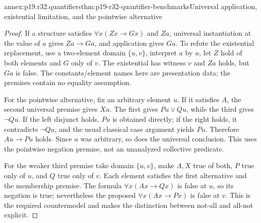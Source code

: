 \begin{annexitem}{annex:p19.r32.quantifiers}{thm:p19-r32-quantifier-benchmarks}{Universal application, existential limitation, and the pointwise alternative}
\begin{proof}
If a structure satisfies \(\forall x(Zx\to Gx)\) and \(Za\),
universal instantiation at the value of \(a\) gives \(Za\to Ga\),
and application gives \(Ga\). To refute the existential replacement,
use a two-element domain \(\{u,v\}\), interpret \(a\) by \(u\),
let \(Z\) hold of both elements and \(G\) only of \(v\).
The existential has witness \(v\) and \(Za\) holds, but \(Ga\)
is false. The constants/element names here are presentation data;
the premises contain no equality assumption.

For the pointwise alternative, fix an arbitrary element \(u\).
If it satisfies \(A\), the second universal premise gives \(Xu\).
The first gives \(Pu\lor Qu\), while the third gives \(\neg Qu\).
If the left disjunct holds, \(Pu\) is obtained directly; if the right
holds, it contradicts \(\neg Qu\), and the usual classical case
argument yields \(Pu\). Therefore \(Au\to Pu\) holds. Since
\(u\) was arbitrary, so does the universal conclusion. This uses
the pointwise negation premise, not an unanalyzed collective predicate.

For the weaker third premise take domain \(\{u,v\}\), make \(A,X\)
true of both, \(P\) true only of \(u\), and \(Q\) true only of
\(v\). Each element satisfies the first alternative and the
membership premise. The formula \(\forall x(Ax\to Qx)\) is false
at \(u\), so its negation is true; nevertheless the proposed
\(\forall x(Ax\to Px)\) is false at \(v\). This is the required
countermodel and makes the distinction between not-all and all-not
explicit.
\end{proof}
\end{annexitem}

